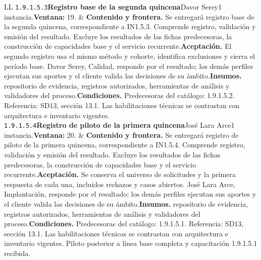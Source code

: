 \begin{longtable}{L{\tabcolsep\relax}L{\tabcolsep\relax}}
\texttt{1.\allowbreak{}9.\allowbreak{}1.\allowbreak{}5.\allowbreak{}3}\newline{}\textbf{Registro base de la segunda quincena}\newline{}Davor Serey\newline{}1 instancia.\newline{}\textbf{Ventana:} 19. & \textbf{Contenido y frontera.} Se entregará registro base de la segunda quincena, correspondiente a IN1.5.3. Comprende registro, validación y emisión del resultado. Excluye los resultados de las fichas predecesoras, la construcción de capacidades base y el servicio recurrente.\newline{}\textbf{Aceptación.} El segundo registro usa el mismo método y cohorte, identifica exclusiones y cierra el período base. Davor Serey, Calidad, responde por el resultado; los demás perfiles ejecutan sus aportes y el cliente valida las decisiones de su ámbito.\newline{}\textbf{Insumos.} repositorio de evidencia, registros autorizados, herramientas de análisis y validadores del proceso.\newline{}\textbf{Condiciones.} Predecesoras del catálogo: 1.9.1.5.2. Referencia: SD13, sección 13.1. Las habilitaciones técnicas se contrastan con arquitectura e inventario vigentes.\\\hline
\texttt{1.\allowbreak{}9.\allowbreak{}1.\allowbreak{}5.\allowbreak{}4}\newline{}\textbf{Registro de piloto de la primera quincena}\newline{}José Lara Arce\newline{}1 instancia.\newline{}\textbf{Ventana:} 20. & \textbf{Contenido y frontera.} Se entregará registro de piloto de la primera quincena, correspondiente a IN1.5.4. Comprende registro, validación y emisión del resultado. Excluye los resultados de las fichas predecesoras, la construcción de capacidades base y el servicio recurrente.\newline{}\textbf{Aceptación.} Se conserva el universo de solicitudes y la primera respuesta de cada una, incluidos rechazos y casos abiertos. José Lara Arce, Implantación, responde por el resultado; los demás perfiles ejecutan sus aportes y el cliente valida las decisiones de su ámbito.\newline{}\textbf{Insumos.} repositorio de evidencia, registros autorizados, herramientas de análisis y validadores del proceso.\newline{}\textbf{Condiciones.} Predecesoras del catálogo: 1.9.1.5.1. Referencia: SD13, sección 13.1. Las habilitaciones técnicas se contrastan con arquitectura e inventario vigentes. Piloto posterior a línea base completa y capacitación 1.9.1.5.1 recibida.\\\hline

\end{longtable}
